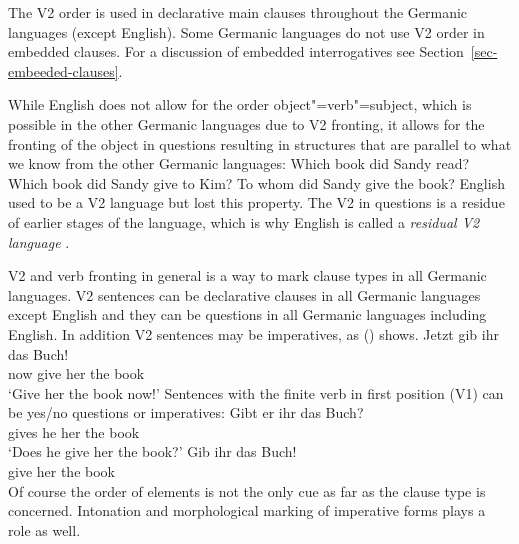 The V2 order is used in declarative main clauses throughout the Germanic languages (except
English). Some Germanic languages do not use V2 order in embedded clauses. For a discussion of
embedded interrogatives see Section~\ref{sec-embeeded-clauses}.

While English does not allow for the order object"=verb"=subject, which is possible in the other Germanic
languages due to V2 fronting, it allows for the fronting of the object in questions resulting in
structures that are parallel to what we know from the other Germanic languages:
\eal
\ex Which book did Sandy read?
\ex Which book did Sandy give to Kim?
\ex To whom did Sandy give the book?
\zl
English used to be a V2 language but lost this property. The V2 in questions is a residue of earlier
stages of the language, which is why English is called a \emph{residual V2 language} \citep[]{Rizzi1990a-u}. 

V2 and verb fronting in general is a way to mark clause types in all Germanic languages. V2 sentences
can be declarative clauses in all Germanic languages except English and they can be questions in all
Germanic languages including English. In addition V2 sentences may be imperatives, as () shows.
\ea
\gll Jetzt gib ihr das Buch!\\
     now give her the book\\\german
\glt `Give her the book now!'
\z
Sentences with the finite verb in first position (V1) can be yes/no questions or imperatives:
\eal
\ex
\gll Gibt er ihr das Buch?\\
     gives he her the book\\\german
\glt `Does he give her the book?'
\ex 
\gll Gib ihr das Buch!\\
     give her the book\\
\zl
Of course the order of elements is not the only cue as far as the clause type is
concerned. Intonation and morphological marking of imperative forms plays a role as well.


